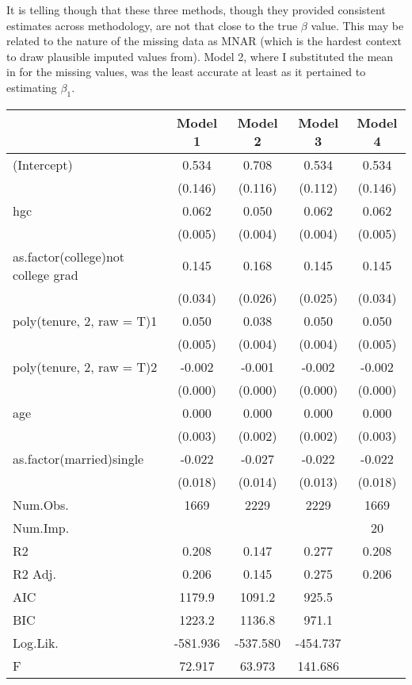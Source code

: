 \documentclass{article}
\begin{document}
It is telling though that these three methods, though they provided consistent estimates across methodology, are not that close to the true $\beta$ value. This may be related to the nature of the missing data as MNAR (which is the hardest context to draw plausible imputed values from). Model 2, where I substituted the mean in for the missing values, was the least accurate at least as it pertained to estimating $\beta_1$. 
\begin{table}
\centering
\begin{tabular}[t]{lcccc}
\toprule
  & Model 1 & Model 2 & Model 3 & Model 4\\
\midrule
(Intercept) & 0.534 & 0.708 & 0.534 & 0.534\\
 & (0.146) & (0.116) & (0.112) & (0.146)\\
hgc & 0.062 & 0.050 & 0.062 & 0.062\\
 & (0.005) & (0.004) & (0.004) & \vphantom{1} (0.005)\\
as.factor(college)not college grad & 0.145 & 0.168 & 0.145 & 0.145\\
 & (0.034) & (0.026) & (0.025) & (0.034)\\
poly(tenure, 2, raw = T)1 & 0.050 & 0.038 & 0.050 & 0.050\\
 & (0.005) & (0.004) & (0.004) & (0.005)\\
poly(tenure, 2, raw = T)2 & -0.002 & -0.001 & -0.002 & -0.002\\
 & (0.000) & (0.000) & (0.000) & (0.000)\\
age & 0.000 & 0.000 & 0.000 & 0.000\\
 & (0.003) & (0.002) & (0.002) & (0.003)\\
as.factor(married)single & -0.022 & -0.027 & -0.022 & -0.022\\
 & (0.018) & (0.014) & (0.013) & (0.018)\\
\midrule
Num.Obs. & 1669 & 2229 & 2229 & 1669\\
Num.Imp. &  &  &  & 20\\
R2 & 0.208 & 0.147 & 0.277 & 0.208\\
R2 Adj. & 0.206 & 0.145 & 0.275 & 0.206\\
AIC & 1179.9 & 1091.2 & 925.5 & \\
BIC & 1223.2 & 1136.8 & 971.1 & \\
Log.Lik. & -581.936 & -537.580 & -454.737 & \\
F & 72.917 & 63.973 & 141.686 & \\
\bottomrule
\end{tabular}
\end{table}
\end{document}
